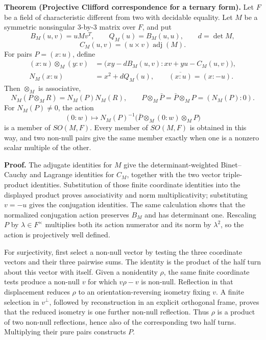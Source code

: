 \documentclass[11pt]{article}
\begin{document}
\medskip
\noindent\textbf{Theorem (Projective Clifford correspondence for a ternary
form).}
Let \(F\) be a field of characteristic different from two with decidable
equality.  Let \(M\) be a symmetric nonsingular \(3\)-by-\(3\) matrix over
\(F\), and put
\[
 B_M(u,v)=uMv^T,\qquad Q_M(u)=B_M(u,u),\qquad d=\det M,
\]
\[
 C_M(u,v)=(u\mathbin\times v)\operatorname{adj}(M).
\]
For pairs \(P=(x:u)\), define
\[
\begin{split}
 (x:u)\otimes_M(y:v)
   &=
 \bigl(xy-dB_M(u,v):xv+yu-C_M(u,v)\bigr),\\
 N_M(x:u)&=x^2+dQ_M(u),\qquad
 \overline{(x:u)}=(x:-u).
\end{split}
\]
Then \(\otimes_M\) is associative,
\[
 N_M(P\otimes_M R)=N_M(P)N_M(R),
 \qquad
 P\otimes_M\bar P=\bar P\otimes_M P=(N_M(P):0).
\]
For \(N_M(P)\ne0\), the action
\[
 (0:w)\longmapsto
 N_M(P)^{-1}\bigl(\bar P\otimes_M(0:w)\otimes_M P\bigr)
\]
is a member of \(SO(M,F)\).  Every member of \(SO(M,F)\) is obtained in this
way, and two non-null pairs give the same member exactly when one is a
nonzero scalar multiple of the other.

\smallskip
\noindent\textbf{Proof.}
The adjugate identities for \(M\) give the determinant-weighted
Binet--Cauchy and Lagrange identities for \(C_M\), together with the two
vector triple-product identities.  Substitution of those finite coordinate
identities into the displayed product proves associativity and norm
multiplicativity; substituting \(v=-u\) gives the conjugation identities.
The same calculation shows that the normalized conjugation action preserves
\(B_M\) and has determinant one.  Rescaling \(P\) by
\(\lambda\in F^\times\) multiplies both its action numerator and its norm by
\(\lambda^2\), so the action is projectively well defined.

For surjectivity, first select a non-null vector by testing the three
coordinate vectors and their three pairwise sums.  The identity is the
product of the half turn about this vector with itself.  Given a nonidentity
\(\rho\), the same finite coordinate tests produce a non-null \(v\) for
which \(v\rho-v\) is non-null.  Reflection in that displacement reduces
\(\rho\) to an orientation-reversing isometry fixing \(v\).  A finite
selection in \(v^\perp\), followed by reconstruction in an explicit
orthogonal frame, proves that the reduced isometry is one further non-null
reflection.  Thus \(\rho\) is a product of two non-null reflections, hence
also of the corresponding two half turns.  Multiplying their pure pairs
constructs \(P\).
\end{document}
